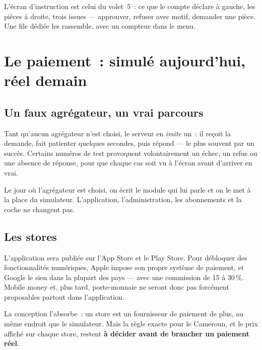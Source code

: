 L'écran d'instruction est celui du volet~5~: ce que le compte déclare à gauche, les pièces à
droite, trois issues --- approuver, refuser avec motif, demander une pièce. Une file dédiée
les rassemble, avec un compteur dans le menu.

\chapter{Le paiement~: simulé aujourd'hui, réel demain}

\section{Un faux agrégateur, un vrai parcours}

Tant qu'aucun agrégateur n'est choisi, le serveur en \emph{imite} un~: il reçoit la demande,
fait patienter quelques secondes, puis répond --- le plus souvent par un succès. Certains
numéros de test provoquent volontairement un échec, un refus ou une absence de réponse, pour
que chaque cas soit vu à l'écran avant d'arriver en vrai.

Le jour où l'agrégateur est choisi, on écrit le module qui lui parle et on le met à la place
du simulateur. L'application, l'administration, les abonnements et la coche ne changent pas.

\section{Les stores}

\begin{alerte}
L'application sera publiée sur l'App Store et le Play Store. Pour débloquer des
fonctionnalités numériques, Apple impose son propre système de paiement, et Google le sien
dans la plupart des pays --- avec une commission de 15 à 30\,\%. Mobile money et, plus tard,
porte-monnaie ne seront donc pas forcément proposables partout dans l'application.

La conception l'absorbe~: un store est un fournisseur de paiement de plus, au même endroit que
le simulateur. Mais la règle exacte pour le Cameroun, et le prix affiché sur chaque store,
restent \textbf{à décider avant de brancher un paiement réel}.
\end{alerte}
